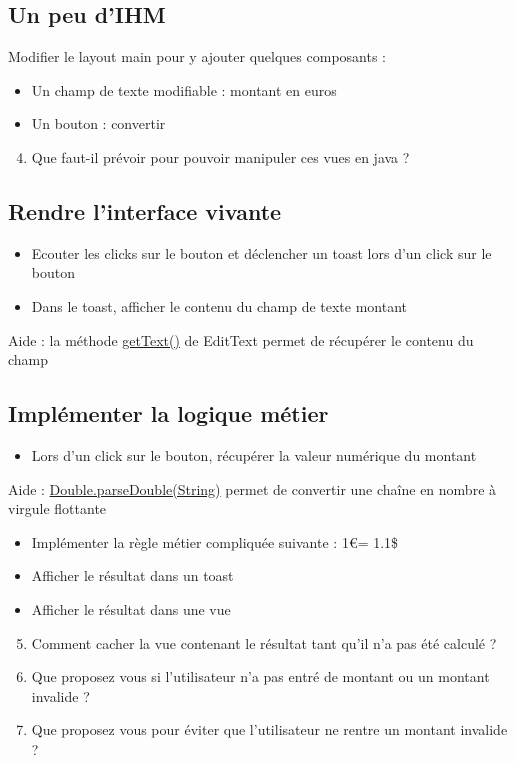 \documentclass{article}
\begin{document}
\subsection{Un peu d'IHM}
Modifier le layout main pour y ajouter quelques composants :
\begin{itemize}
\item Un champ de texte modifiable : montant en euros
\item Un bouton : convertir
\end{itemize}
\begin{enumerate}
 \setcounter{enumi}{3}
\item Que faut-il prévoir pour pouvoir manipuler ces vues en java ?
\end{enumerate}
\subsection{Rendre l'interface vivante}
\begin{itemize}
\item Ecouter les clicks sur le bouton et déclencher un toast lors d'un click sur le bouton
\item Dans le toast, afficher le contenu du champ de texte montant
\end{itemize}
Aide : la méthode
\href{http://developer.android.com/reference/android/widget/EditText.html#getText()}{getText()} de EditText permet de récupérer le contenu du champ
\subsection{Implémenter la logique métier}
\begin{itemize}
\item Lors d'un click sur le bouton, récupérer la valeur numérique du montant
\end{itemize}
Aide :
\href{http://developer.android.com/reference/java/lang/Double.html#parseDouble(java.lang.String)}{Double.parseDouble(String)}
permet de convertir une chaîne en nombre à virgule flottante
\begin{itemize}
\item Implémenter la règle métier compliquée suivante : 1\euro  = 1.1\$
\item Afficher le résultat dans un toast
\item Afficher le résultat dans une vue
\end{itemize}
\begin{enumerate}
 \setcounter{enumi}{4}
\item Comment cacher la vue contenant le résultat tant qu'il n'a pas été
calculé ?
\item Que proposez vous si l'utilisateur n'a pas entré de montant ou un montant
invalide ?
\item Que proposez vous pour éviter que l'utilisateur ne rentre un montant
invalide ?
\end{enumerate}
\end{document}
